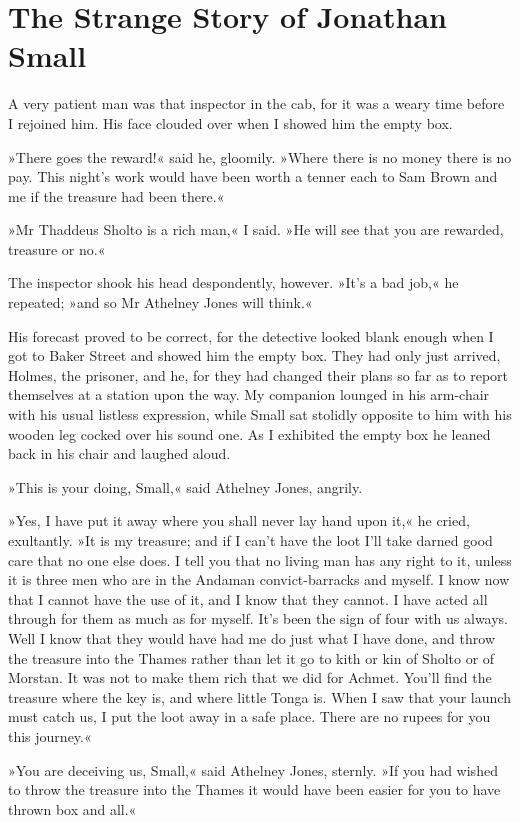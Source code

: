 \chapter{The Strange Story of Jonathan Small}
\lettrine[lines=4]{A}{} very patient man was that inspector in the cab, for it was a weary time before I rejoined him. His face clouded over when I showed him the empty box.

\zz
»There goes the reward!« said he, gloomily. »Where there is no money there is no pay. This night's work would have been worth a tenner each to Sam Brown and me if the treasure had been there.«

»Mr Thaddeus Sholto is a rich man,« I said. »He will see that you are rewarded, treasure or no.«

The inspector shook his head despondently, however. »It's a bad job,« he repeated; »and so Mr Athelney Jones will think.«

His forecast proved to be correct, for the detective looked blank enough when I got to Baker Street and showed him the empty box. They had only just arrived, Holmes, the prisoner, and he, for they had changed their plans so far as to report themselves at a station upon the way. My companion lounged in his arm-chair with his usual listless expression, while Small sat stolidly opposite to him with his wooden leg cocked over his sound one. As I exhibited the empty box he leaned back in his chair and laughed aloud.

»This is your doing, Small,« said Athelney Jones, angrily.

»Yes, I have put it away where you shall never lay hand upon it,« he cried, exultantly. »It is my treasure; and if I can't have the loot I'll take darned good care that no one else does. I tell you that no living man has any right to it, unless it is three men who are in the Andaman convict-barracks and myself. I know now that I cannot have the use of it, and I know that they cannot. I have acted all through for them as much as for myself. It's been the sign of four with us always. Well I know that they would have had me do just what I have done, and throw the treasure into the Thames rather than let it go to kith or kin of Sholto or of Morstan. It was not to make them rich that we did for Achmet. You'll find the treasure where the key is, and where little Tonga is. When I saw that your launch must catch us, I put the loot away in a safe place. There are no rupees for you this journey.«

»You are deceiving us, Small,« said Athelney Jones, sternly. »If you had wished to throw the treasure into the Thames it would have been easier for you to have thrown box and all.«

